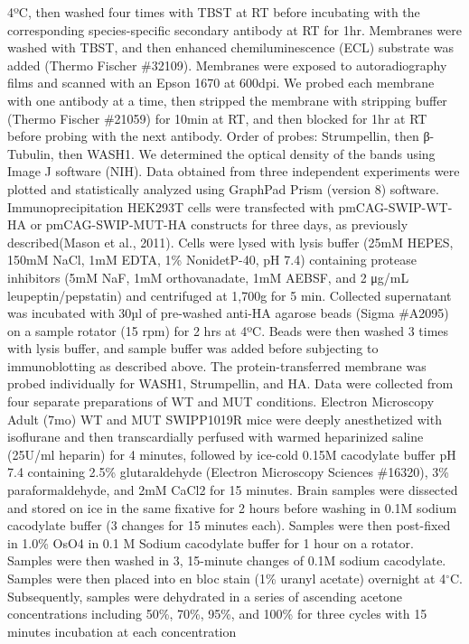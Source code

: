 4ºC, then washed four times with TBST at RT before incubating with the
corresponding species-specific secondary antibody at RT for 1hr. Membranes were
washed with TBST, and then enhanced chemiluminescence (ECL) substrate was added
(Thermo Fischer \#32109). Membranes were exposed to autoradiography films and
scanned with an Epson 1670 at 600dpi. We probed each membrane with one antibody
at a time, then stripped the membrane with stripping buffer (Thermo Fischer
\#21059) for 10min at RT, and then blocked for 1hr at RT before probing with the
next antibody. Order of probes: Strumpellin, then β-Tubulin, then WASH1. We
determined the optical density of the bands using Image J software (NIH). Data
obtained from three independent experiments were plotted and statistically
analyzed using GraphPad Prism (version 8) software.
Immunoprecipitation
HEK293T cells were transfected with pmCAG-SWIP-WT-HA or pmCAG-SWIP-MUT-HA
constructs for three days, as previously described(Mason et al., 2011). Cells
were lysed with lysis buffer (25mM HEPES, 150mM NaCl, 1mM EDTA, 1\% NonidetP-40,
pH 7.4) containing protease inhibitors (5mM NaF, 1mM orthovanadate, 1mM AEBSF,
and 2 μg/mL leupeptin/pepstatin) and centrifuged at 1,700g for 5 min. Collected
supernatant was incubated with 30µl of pre-washed anti-HA agarose beads (Sigma
\#A2095) on a sample rotator (15 rpm) for 2 hrs at 4ºC. Beads were then washed 3
times with lysis buffer, and sample buffer was added before subjecting to
immunoblotting as described above. The protein-transferred membrane was probed
individually for WASH1, Strumpellin, and HA. Data were collected from four
separate preparations of WT and MUT conditions. 
Electron Microscopy
Adult (7mo) WT and MUT SWIPP1019R mice were deeply anesthetized with isoflurane
and then transcardially perfused with warmed heparinized saline (25U/ml heparin)
for 4 minutes, followed by ice-cold 0.15M cacodylate buffer pH 7.4 containing
2.5\% glutaraldehyde (Electron Microscopy Sciences \#16320), 3\% paraformaldehyde,
and 2mM CaCl2 for 15 minutes. Brain samples were dissected and stored on ice in
the same fixative for 2 hours before washing in 0.1M sodium cacodylate buffer (3
changes for 15 minutes each). Samples were then post-fixed in 1.0\% OsO4 in 0.1 M
Sodium cacodylate buffer for 1 hour on a rotator. Samples were then washed in 3,
15-minute changes of 0.1M sodium cacodylate. Samples were then placed into en
bloc stain (1\% uranyl acetate) overnight at 4$^{\circ}$C. Subsequently, samples were
dehydrated in a series of ascending acetone concentrations including 50\%, 70\%,
95\%, and 100\% for three cycles with 15 minutes incubation at each concentration
